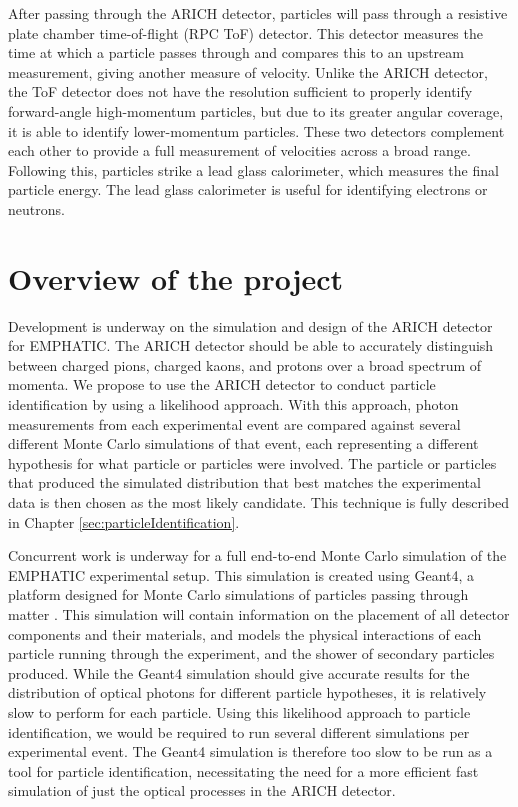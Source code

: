 After passing through the ARICH detector, particles will pass through a resistive plate chamber time-of-flight (RPC ToF) detector.
This detector measures the time at which a particle passes through and compares this to an upstream measurement, giving another measure of velocity. 
Unlike the ARICH detector, the ToF detector does not have the resolution sufficient to properly identify forward-angle high-momentum particles, but due to its greater angular coverage, it is able to identify lower-momentum particles.
These two detectors complement each other to provide a full measurement of velocities across a broad range.
Following this, particles strike a lead glass calorimeter, which measures the final particle energy.
The lead glass calorimeter is useful for identifying electrons or neutrons.

\section{Overview of the project}
Development is underway on the simulation and design of the ARICH detector for EMPHATIC.
The ARICH detector should be able to accurately distinguish between charged pions, charged kaons, and protons over a broad spectrum of momenta.
We propose to use the ARICH detector to conduct particle identification by using a likelihood approach. 
With this approach, photon measurements from each experimental event are compared against several different Monte Carlo simulations of that event, each representing a different hypothesis for what particle or particles were involved.
The particle or particles that produced the simulated distribution that best matches the experimental data is then chosen as the most likely candidate.
This technique is fully described in Chapter \ref{sec:particleIdentification}. 

Concurrent work is underway for a full end-to-end Monte Carlo simulation of the EMPHATIC experimental setup.
This simulation is created using Geant4, a platform designed for Monte Carlo simulations of particles passing through matter \cite{geant4}.
This simulation will contain information on the placement of all detector components and their materials, and models the physical interactions of each particle running through the experiment, and the shower of secondary particles produced. 
While the Geant4 simulation should give accurate results for the distribution of optical photons for different particle hypotheses, it is relatively slow to perform for each particle.
Using this likelihood approach to particle identification, we would be required to run several different simulations per experimental event.
The Geant4 simulation is therefore too slow to be run as a tool for particle identification, necessitating the need for a more efficient fast simulation of just the optical processes in the ARICH detector. 

